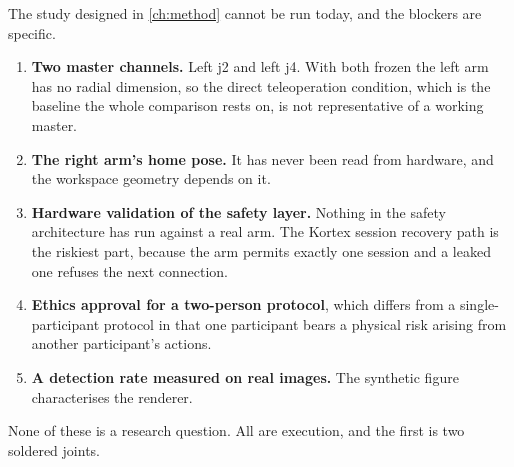 The study designed in \cref{ch:method} cannot be run today, and the blockers
are specific.

\begin{enumerate}
  \item \textbf{Two master channels.} Left j2 and left j4. With both frozen
    the left arm has no radial dimension, so the direct teleoperation
    condition, which is the baseline the whole comparison rests on, is not
    representative of a working master.
  \item \textbf{The right arm's home pose.} It has never been read from
    hardware, and the workspace geometry depends on it.
  \item \textbf{Hardware validation of the safety layer.} Nothing in the
    safety architecture has run against a real arm. The Kortex session
    recovery path is the riskiest part, because the arm permits exactly one
    session and a leaked one refuses the next connection.
  \item \textbf{Ethics approval for a two-person protocol}, which differs from
    a single-participant protocol in that one participant bears a physical
    risk arising from another participant's actions.
  \item \textbf{A detection rate measured on real images.} The synthetic
    figure characterises the renderer.
\end{enumerate}

None of these is a research question. All are execution, and the first is two
soldered joints.

